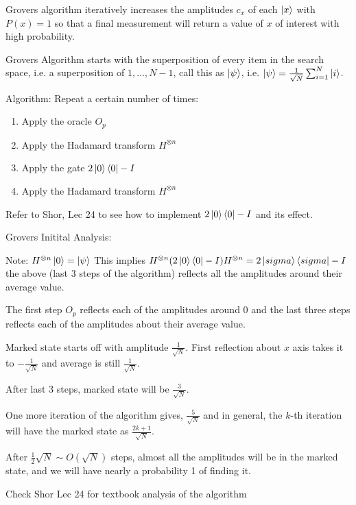 \documentclass[12pt,twoside,fleqn]{report}
\theoremstyle{thmstyle}
\begin{document}
Grovers algorithm iteratively increases the amplitudes $c_x$ of each $\ket{x}$ with $P(x) = 1$ so that a final measurement will return a value of $x$ of interest with high probability.


Grovers Algorithm starts with the superposition of every item in the search space, i.e. a superposition of $1, ..., N-1$, call this as $\ket\psi$, i.e. $\ket\psi = \frac{1}{\sqrt{N}} \sum_{i=1}^N \ket{i}$.


Algorithm:
Repeat a certain number of times:
\begin{enumerate}
    \item Apply the oracle $O_p$
    \item Apply the Hadamard transform $H^{\otimes n}$ 
    \item Apply the gate $2 \ket{0}\bra{0} - I$
    \item Apply the Hadamard transform $H^{\otimes n}$ 
\end{enumerate}

Refer to Shor, Lec 24 to see how to implement $2 \ket{0}\bra{0} - I$ and its effect. 

Grovers Initital Analysis: 

Note: $H^{\otimes n} \ket{0} = \ket{\psi}$
This implies $H^{\otimes n} (2 \ket{0}\bra{0} - I) H^{\otimes n} = 2 \ket{sigma}\bra{sigma} - I$
 the above (last 3 steps of the algorithm) reflects all the amplitudes around their average value.

The first step $O_p$ reflects each of the amplitudes around $0$ and the last three steps reflects each of the amplitudes about their average value.

Marked state starts off with amplitude $\frac{1}{\sqrt{N}}$. First reflection about $x$ axis takes it to $- \frac{1}{\sqrt{N}}$ and average is still $\frac{1}{\sqrt{N}}$.

After last 3 steps, marked state will be $\frac{3}{\sqrt{N}}$.

One more iteration of the algorithm gives, $\frac{5}{\sqrt{N}}$ and in general, the $k$-th iteration will have the marked state as $\frac{2k + 1}{\sqrt{N}}$.

After $\frac{1}{2} \sqrt{N} \sim O(\sqrt{N})$ steps, almost all the amplitudes will be in the marked state, and we will have nearly a probability 1 of finding it.


Check Shor Lec 24 for textbook analysis of the algorithm










\newpage
{}
\begin{thebibliography}{9}
        \lipsum[1][1-3]
        \lipsum[2][1-3]
        \lipsum[3][1-3]
        \lipsum[4][1-3]
        \lipsum[5][1-3]
        \lipsum[6][1-3]
\end{thebibliography}
\end{document}
